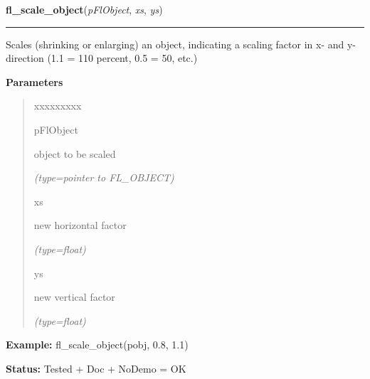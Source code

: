     \label{xformslib:flbasic:fl_scale_object}

    \vspace{0.5ex}

\hspace{.8\funcindent}\begin{boxedminipage}{\funcwidth}

    \raggedright \textbf{fl\_scale\_object}(\textit{pFlObject}, \textit{xs}, \textit{ys})

    \vspace{-1.5ex}

    \rule{\textwidth}{0.5\fboxrule}
\setlength{\parskip}{2ex}
    Scales (shrinking or enlarging) an object, indicating a scaling factor 
    in x- and y-direction (1.1 = 110 percent, 0.5 = 50, etc.)

\setlength{\parskip}{1ex}
      \textbf{Parameters}
      \vspace{-1ex}

      \begin{quote}
        \begin{Ventry}{xxxxxxxxx}

          \item[pFlObject]

          object to be scaled

            {\it (type=pointer to FL\_OBJECT)}

          \item[xs]

          new horizontal factor

            {\it (type=float)}

          \item[ys]

          new vertical factor

            {\it (type=float)}

        \end{Ventry}

      \end{quote}

\textbf{Example:} fl\_scale\_object(pobj, 0.8, 1.1)



\textbf{Status:} Tested + Doc + NoDemo = OK



    \end{boxedminipage}

